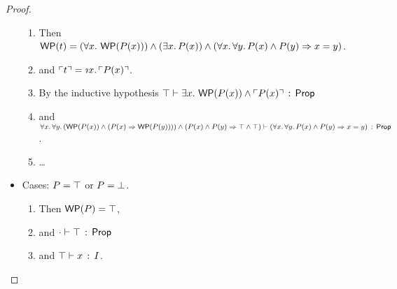 \documentclass[10pt,letter]{article}
\begin{document}
\begin{proof}
\begin{itemize}
    \begin{enumerate}
      \item 
        Then
        $\mathop{\mathsf{WP}}(t) = 
        (\forall x.\, \mathop{\mathsf{WP}}(P(x))) \wedge (\exists x.\, P(x)) \wedge (\forall x.\, \forall y.\, P(x) \wedge P(y) \Rightarrow x=y)$.
      \item
        and 
        $\trans{\t} = \tDesc{\x}{\I}{\trans{\p(\x)}}$.
      \item 
        By the inductive hypothesis
        $\top \vdash \exists x.\, \mathop{\mathsf{WP}}(P(x)) \wedge \ulcorner P(x) \urcorner\, :\, \mathsf{Prop}$
      \item
        and 
        $\forall x.\, \forall y.\, (\mathop{\mathsf{WP}}(P(x)) \wedge (P(x) \Rightarrow \mathop{\mathsf{WP}}(P(y)))) \wedge (P(x) \wedge P(y) \Rightarrow \top \wedge \top) \vdash (\forall x.\, \forall y.\, P(x) \wedge P(y) \Rightarrow x=y)\, :\, \mathsf{Prop}$.
        \item \ldots
      \end{enumerate}
      
  \item Cases: $P = \top$ or $P = \bot$.
      \begin{enumerate}
      \item 
      	Then $\mathop{\mathsf{WP}}(P) = \top$,
      \item
        and $\cdot \vdash \top\, :\, \mathsf{Prop}$ 
      \item
        and $\top \vdash x\, :\, I$.
      \end{enumerate}
      

\end{itemize}
\end{proof}
\end{document}
